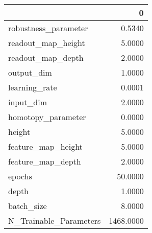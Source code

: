 \begin{tabular}{lr}
\toprule
{} &          0 \\
\midrule
robustness\_parameter   &     0.5340 \\
readout\_map\_height     &     5.0000 \\
readout\_map\_depth      &     2.0000 \\
output\_dim             &     1.0000 \\
learning\_rate          &     0.0001 \\
input\_dim              &     2.0000 \\
homotopy\_parameter     &     0.0000 \\
height                 &     5.0000 \\
feature\_map\_height     &     5.0000 \\
feature\_map\_depth      &     2.0000 \\
epochs                 &    50.0000 \\
depth                  &     1.0000 \\
batch\_size             &     8.0000 \\
N\_Trainable\_Parameters &  1468.0000 \\
\bottomrule
\end{tabular}
